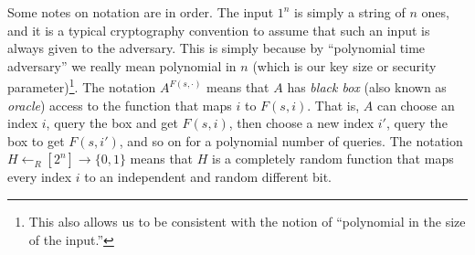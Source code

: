 Some notes on notation are in order. The input \(1^n\) is simply a
string of \(n\) ones, and it is a typical cryptography convention to
assume that such an input is always given to the adversary. This is
simply because by ``polynomial time adversary'' we really mean
polynomial in \(n\) (which is our key size or security
parameter)\footnote{This also allows us to be consistent with the notion
  of ``polynomial in the size of the input.''}. The notation
\(A^{F(s,\cdot)}\) means that \(A\) has \emph{black box} (also known as
\emph{oracle}) access to the function that maps \(i\) to \(F(s,i)\).
That is, \(A\) can choose an index \(i\), query the box and get
\(F(s,i)\), then choose a new index \(i'\), query the box to get
\(F(s,i')\), and so on for a polynomial number of queries. The notation
\(H \leftarrow_R [2^n] \rightarrow \{0,1\}\) means that \(H\) is a
completely random function that maps every index \(i\) to an independent
and random different bit.

